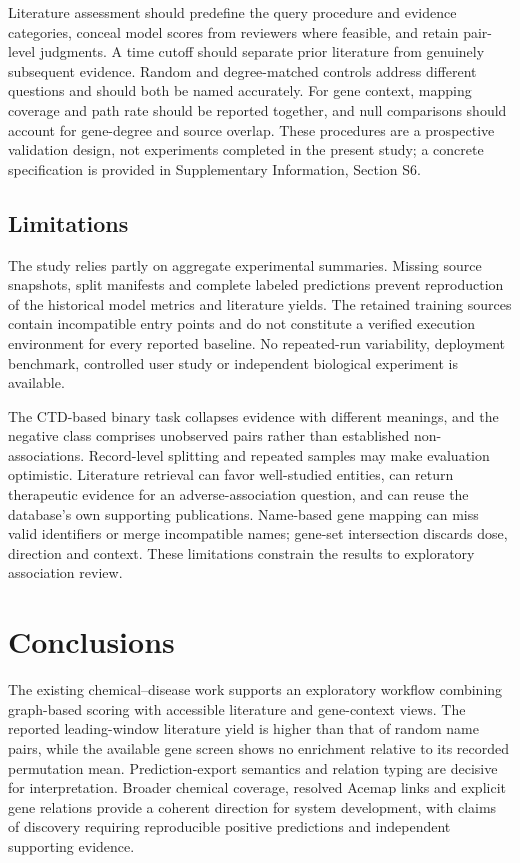 Literature assessment should predefine the query procedure and evidence categories, conceal model scores from reviewers where feasible, and retain pair-level judgments. A time cutoff should separate prior literature from genuinely subsequent evidence. Random and degree-matched controls address different questions and should both be named accurately. For gene context, mapping coverage and path rate should be reported together, and null comparisons should account for gene-degree and source overlap. These procedures are a prospective validation design, not experiments completed in the present study; a concrete specification is provided in Supplementary Information, Section S6.

\subsection{Limitations}
The study relies partly on aggregate experimental summaries. Missing source snapshots, split manifests and complete labeled predictions prevent reproduction of the historical model metrics and literature yields. The retained training sources contain incompatible entry points and do not constitute a verified execution environment for every reported baseline. No repeated-run variability, deployment benchmark, controlled user study or independent biological experiment is available.

The CTD-based binary task collapses evidence with different meanings, and the negative class comprises unobserved pairs rather than established non-associations. Record-level splitting and repeated samples may make evaluation optimistic. Literature retrieval can favor well-studied entities, can return therapeutic evidence for an adverse-association question, and can reuse the database's own supporting publications. Name-based gene mapping can miss valid identifiers or merge incompatible names; gene-set intersection discards dose, direction and context. These limitations constrain the results to exploratory association review.

\section{Conclusions}
The existing chemical--disease work supports an exploratory workflow combining graph-based scoring with accessible literature and gene-context views. The reported leading-window literature yield is higher than that of random name pairs, while the available gene screen shows no enrichment relative to its recorded permutation mean. Prediction-export semantics and relation typing are decisive for interpretation. Broader chemical coverage, resolved Acemap links and explicit gene relations provide a coherent direction for system development, with claims of discovery requiring reproducible positive predictions and independent supporting evidence.

